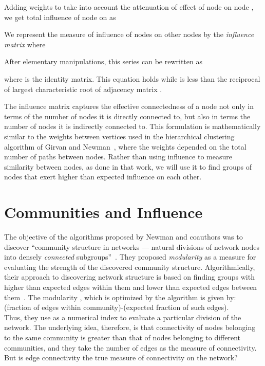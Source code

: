 \documentclass{sig-alternate}
\begin{document}
Adding weights to take into account the attenuation of effect of node  on node , we get total influence of node  on  as




We  represent  the measure of influence of nodes on other nodes by the \emph {influence matrix}  where
 
After elementary manipulations, this series can be rewritten as

where  is the identity matrix. This equation holds while   is less than the reciprocal of largest characteristic root of adjacency matrix   \cite{Ferrar}.


The influence matrix captures the effective connectedness of a node not only in terms of the number of nodes  it  is directly connected to, but also in terms the number of nodes it is indirectly connected to.
This formulation is mathematically similar to the weights between vertices used in the hierarchical clustering  algorithm of Girvan and Newman~\cite{GirvanNewman02}, where the weights depended on the total number of paths between nodes.
Rather than using influence to measure similarity between nodes, as done in that work, we will use it to find groups of nodes that exert higher than expected influence on each other.



\section{Communities and Influence}
\label{sec:modularity}

The objective of the algorithms proposed by  Newman and coauthors was to discover ``community structure in networks --- natural divisions of network nodes into densely \emph{connected} subgroups''~\cite{GirvanNewman04}. They proposed \emph{modularity} as a measure for evaluating the strength of the discovered community structure. Algorithmically, their approach to discovering network structure is based on finding groups with higher than expected edges within them and lower than expected edges between them~\cite{Newman104,Newman204,Newman106,Newman206}. The modularity , which is optimized by the algorithm is given by:\\
 (fraction of edges within community)-(expected fraction of such edges). \\
Thus, they use  as a numerical index to evaluate a particular division of the network. The underlying idea, therefore, is that connectivity of nodes belonging to the same community is greater than that of nodes belonging to different communities, and they take the number of edges as the measure of connectivity. But is edge connectivity the true measure of connectivity on the network?
\end{document}
